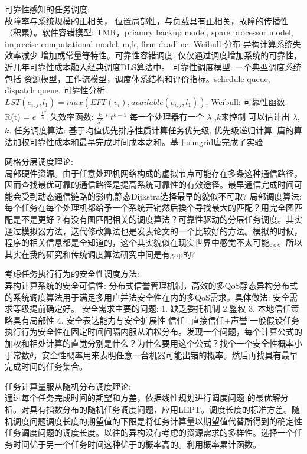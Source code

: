 \documentclass[UTF8]{article}
\begin{document}
    可靠性感知的任务调度:\\ 故障率与系统规模的正相关， 位置局部性，与负载具有正相关，故障的传播性（积累）。软件容错模型: TMR，priamry backup model, spare processor model, imprecise computational model, m,k, firm deadline. Weibull 分布 异构计算系统失效率减少 增加或常量等特性。可靠性容错调度: 仅仅通过调度增加系统的可靠性，近几年可靠性成本融入经典调度DLS算法中。 可靠性调度模型: 一个典型调度系统包括 资源模型，工作流模型，调度体系结构和评价指标。schedule queue, dispatch queue. 可靠性分析: $LST(e_{i,j},l_1) = max(EFT(v_i), available(e_{i,j}, l_1))$. Weibull: 可靠性函数: R(t) = $e^{{-\frac{t}{\lambda}}^k}$ 失效率函数: $\frac{k}{\lambda^k}*t^{k - 1}$ 每一个处理器有一个 $\lambda$ ,$k$来控制 \cite{murthy2004weibull} 可以估计出 $\lambda$,$k$.  任务调度算法: 基于均值优先排序性质计算任务优先级, 优先级递归计算. 唐的算法加权可靠性成本和最早完成时间成本之和。基于simgrid唐完成了实验
    
    网格分层调度理论:\\局部硬件资源。由于任意处理机网络构成的虚拟节点可能存在多条这种通信路径，因而查找最优可靠的通信路径是提高系统可靠性的有效途径。最早通信完成时间可能会受到动态通信链路的影响,静态Dijkstra选择最早的貌似不可取?  局部调度算法: 每个任务在每个处理机都给予一个系统开销然后挨个寻找最大的匹配？用完全图匹配是不是更好？有没有图匹配相关的调度算法？可靠性驱动的分层任务调度。其实通过模拟器方法，迭代修改算法也是发表论文的一个比较好的方法。模拟的时候，程序的相关信息都是全知道的，这个其实貌似在现实世界中感觉不太可能。。。所以其实在我的研究和传统调度算法研究中间是有gap的?
    
    考虑任务执行行为的安全性调度方法:\\异构计算系统的安全可信性: 分布式信誉管理机制，高效的多QoS静态异构分布式的系统调度算法用于满足多用户并法安全性在内的多QoS需求。具体做法:  安全需求等级提前确定好。 安全需求主要的问题: 1. 缺乏委托机制 2.鉴权 3. 本地信任策略具有局部性 4. 安全表达能力与安全扩展性 信任=直接信任+声誉 一般假设任务执行行为安全性在固定时间间隔内服从泊松分布。发现一个问题，每个计算公式的加权和相处计算的直觉分别是什么？为什么要用这个公式？找个一个安全性概率小于常数$\theta$，安全性概率用来表明任意一台机器可能出错的概率。然后再找具有最早完成时间的任务集合。
    
    任务计算量服从随机分布调度理论:\\ 通过每个任务完成时间的期望和方差，依据线性规划进行调度问题 的最优解分析。对具有指数分布的随机任务调度问题，应用LEPT。调度长度的标准方差。随机调度问题调度长度的期望值的下限是将任务计算量以期望值代替所得到的确定性任务调度问题的调度长度。以往的异构没有考虑的资源需求的多样性。选择一个任务时间优于另一个任务时间这种优于的概率高的。利用概率累计函数。
    
\end{document}
